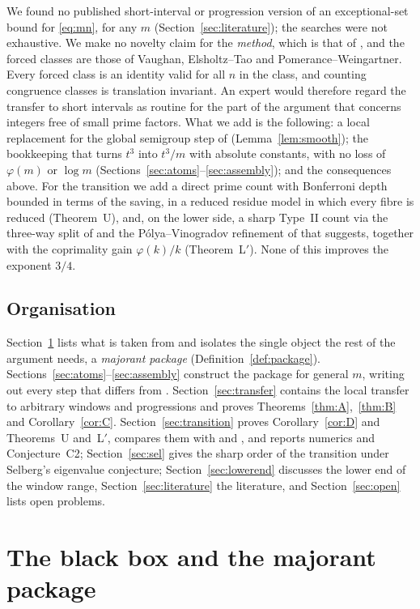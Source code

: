 \documentclass[10pt,reqno]{amsart}
\theoremstyle{definition}
\begin{document}
We found no published short-interval or progression version of an
exceptional-set bound for \eqref{eq:mn}, for any $m$
(Section~\ref{sec:literature}); the searches were not exhaustive.  We
make no novelty claim for the \emph{method}, which is that of \cite{TQ},
and the forced classes are those of Vaughan, Elsholtz--Tao and
Pomerance--Weingartner.  Every forced class is an identity valid for all
$n$ in the class, and counting congruence classes is translation
invariant.  An expert would therefore regard the transfer to short
intervals as routine for the part of the argument that concerns integers
free of small prime factors.  What we add is the following: a local
replacement for the global semigroup step of \cite{TQ}
(Lemma~\ref{lem:smooth}); the bookkeeping that turns $t^3$ into $t^3/m$
with absolute constants, with no loss of $\varphi(m)$ or $\log m$
(Sections~\ref{sec:atoms}--\ref{sec:assembly}); and the consequences
above.  For the transition we add a direct prime count with Bonferroni
depth bounded in terms of the saving, in a reduced residue model in
which every fibre is reduced (Theorem~U), and, on the lower side, a
sharp Type~II count via the three-way split of \cite[\S9]{ET} and the
P\'olya--Vinogradov refinement of \cite[Prop.~1.4]{ET} that
\cite[Rem.~1.5]{ET} suggests, together with the coprimality gain $\varphi(k)/k$ (Theorem~L$'$).  None of this improves the
exponent $3/4$.

\subsection*{Organisation}
Section~\ref{sec:blackbox} lists what is taken from \cite{TQ} and
isolates the single object the rest of the argument needs, a
\emph{majorant package} (Definition~\ref{def:package}).
Sections~\ref{sec:atoms}--\ref{sec:assembly} construct the package for
general $m$, writing out every step that differs from \cite{TQ}.
Section~\ref{sec:transfer} contains the local transfer to arbitrary
windows and progressions and proves Theorems~\ref{thm:A},~\ref{thm:B}
and Corollary~\ref{cor:C}.  Section~\ref{sec:transition} proves
Corollary~\ref{cor:D} and Theorems~U and~L$'$, compares them with
\cite{PW} and \cite{Els}, and reports numerics and Conjecture~C2;
Section~\ref{sec:sel} gives the sharp order of the transition under
Selberg's eigenvalue conjecture; Section~\ref{sec:lowerend} discusses the lower
end of the window range, Section~\ref{sec:literature} the literature,
and Section~\ref{sec:open} lists open problems.

\section{The black box and the majorant package}\label{sec:blackbox}
\end{document}
